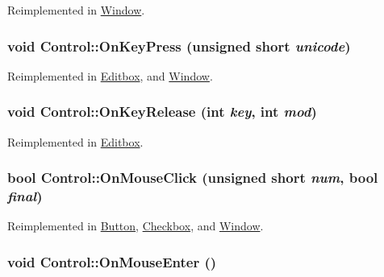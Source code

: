 Reimplemented in \hyperlink{class_window_8102d7f108485e1faf660d158d0070e8}{Window}.\hypertarget{class_control_381e61b70477155845f58a2d17b91c6a}{
\subsubsection[{OnKeyPress}]{\setlength{\rightskip}{0pt plus 5cm}void Control::OnKeyPress (unsigned short {\em unicode})}}
\label{class_control_381e61b70477155845f58a2d17b91c6a}




Reimplemented in \hyperlink{class_editbox_03de7605a4541011037378e745012f17}{Editbox}, and \hyperlink{class_window_f6f46c0dd9ed75cc8639ca61f8773862}{Window}.\hypertarget{class_control_7be3bcc25d2736d0732e29de40c41b9f}{
\subsubsection[{OnKeyRelease}]{\setlength{\rightskip}{0pt plus 5cm}void Control::OnKeyRelease (int {\em key}, \/  int {\em mod})}}
\label{class_control_7be3bcc25d2736d0732e29de40c41b9f}




Reimplemented in \hyperlink{class_editbox_47d72239d116c6574d2f14a84aa658cb}{Editbox}.\hypertarget{class_control_1a32f38d1f66f764e6e3a5d8de42d0e0}{
\subsubsection[{OnMouseClick}]{\setlength{\rightskip}{0pt plus 5cm}bool Control::OnMouseClick (unsigned short {\em num}, \/  bool {\em final})}}
\label{class_control_1a32f38d1f66f764e6e3a5d8de42d0e0}




Reimplemented in \hyperlink{class_button_cad3e7ea82ecd98781863ae7ab082ce8}{Button}, \hyperlink{class_checkbox_d017a9602388bab021f25aa502a2f81f}{Checkbox}, and \hyperlink{class_window_0372a8a9db26dd21a60d4bd71a2547b5}{Window}.\hypertarget{class_control_93451fdae5cd22b9c52374db759c291c}{
\subsubsection[{OnMouseEnter}]{\setlength{\rightskip}{0pt plus 5cm}void Control::OnMouseEnter ()}}
\label{class_control_93451fdae5cd22b9c52374db759c291c}




